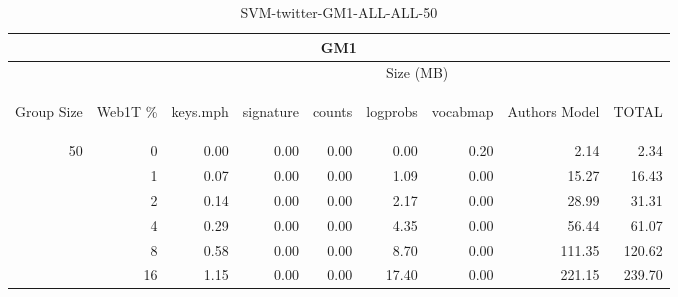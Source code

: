 \begin{center}
\begin{table}[htbp] 
 \begin{center}
\begin{tabular}{ | r | r | r | r | r | r | r | r | r |}
\hline
\multicolumn{9}{|c|}{GM1}\\
\hline
 & & \multicolumn{7}{|c|}{Size (MB)}\\ \cline{3-9}
\begin{sideways}Group Size\end{sideways} & \begin{sideways}Web1T \% \end{sideways} & \begin{sideways}keys.mph\end{sideways} & \begin{sideways}signature\end{sideways} & \begin{sideways}counts\end{sideways} & \begin{sideways}logprobs\end{sideways} & \begin{sideways}vocabmap\end{sideways} & \begin{sideways}Authors Model \end{sideways} & \begin{sideways}TOTAL\end{sideways}\\
\hline
\multirow{5}{*}{50}
 & 0 & 0.00 & 0.00 & 0.00 & 0.00 & 0.20 & 2.14 & 2.34\\ \cline{2-9}
 & 1 & 0.07 & 0.00 & 0.00 & 1.09 & 0.00 & 15.27 & 16.43\\ \cline{2-9}
 & 2 & 0.14 & 0.00 & 0.00 & 2.17 & 0.00 & 28.99 & 31.31\\ \cline{2-9}
 & 4 & 0.29 & 0.00 & 0.00 & 4.35 & 0.00 & 56.44 & 61.07\\ \cline{2-9}
 & 8 & 0.58 & 0.00 & 0.00 & 8.70 & 0.00 & 111.35 & 120.62\\ \cline{2-9}
 & 16 & 1.15 & 0.00 & 0.00 & 17.40 & 0.00 & 221.15 & 239.70\\ \cline{2-9}
\hline
\end{tabular}
\caption{SVM-twitter-GM1-ALL-ALL-50}
\label{table:SVM-twitter-GM1-ALL-ALL-50}
\end{center}
 \end{table}
\end{center}

